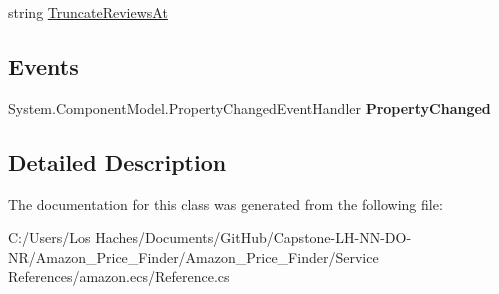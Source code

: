 \begin{DoxyCompactItemize}
\begin{DoxyCompactList}\small\item\em \end{DoxyCompactList}\item 
\hypertarget{class_amazon___price___finder_1_1amazon_1_1ecs_1_1_item_lookup_request_a7606effd380146e395154b80b313ccdb}{string \hyperlink{class_amazon___price___finder_1_1amazon_1_1ecs_1_1_item_lookup_request_a7606effd380146e395154b80b313ccdb}{Truncate\-Reviews\-At}}\label{class_amazon___price___finder_1_1amazon_1_1ecs_1_1_item_lookup_request_a7606effd380146e395154b80b313ccdb}

\begin{DoxyCompactList}\small\item\em \end{DoxyCompactList}\end{DoxyCompactItemize}
\subsection*{Events}
\begin{DoxyCompactItemize}
\item 
\hypertarget{class_amazon___price___finder_1_1amazon_1_1ecs_1_1_item_lookup_request_a753d55da552d76e46617c0fe58de2388}{System.\-Component\-Model.\-Property\-Changed\-Event\-Handler {\bfseries Property\-Changed}}\label{class_amazon___price___finder_1_1amazon_1_1ecs_1_1_item_lookup_request_a753d55da552d76e46617c0fe58de2388}

\end{DoxyCompactItemize}


\subsection{Detailed Description}


The documentation for this class was generated from the following file\-:\begin{DoxyCompactItemize}
\item 
C\-:/\-Users/\-Los Haches/\-Documents/\-Git\-Hub/\-Capstone-\/\-L\-H-\/\-N\-N-\/\-D\-O-\/\-N\-R/\-Amazon\-\_\-\-Price\-\_\-\-Finder/\-Amazon\-\_\-\-Price\-\_\-\-Finder/\-Service References/amazon.\-ecs/Reference.\-cs\end{DoxyCompactItemize}
